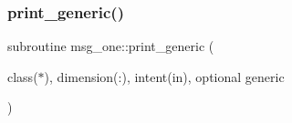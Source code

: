 \mbox{\label{M__strings_8f90_a9d5e1620d474ac03a74eeb9b0f7d6ae1}} 
\subsubsection{\texorpdfstring{print\+\_\+generic()}{print\_generic()}\hspace{0.1cm}{\footnotesize\ttfamily [2/2]}}
{\footnotesize\ttfamily subroutine msg\+\_\+one\+::print\+\_\+generic (\begin{DoxyParamCaption}\item[{class($\ast$), dimension(\+:), intent(in), optional}]{generic }\end{DoxyParamCaption})\hspace{0.3cm}{\ttfamily [private]}}

